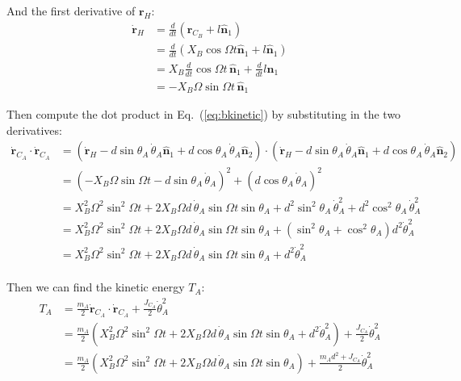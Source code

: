 \documentclass[titlepage]{article}
\begin{document}
And the first derivative of $\boldsymbol{r}_H$:
\begin{equation}
	\begin{split}
		\dot{\boldsymbol{r}}_H&=\frac{d}{dt}\left(\boldsymbol{r}_{C_B}+l\hat{\boldsymbol{n}}_1\right) \\
		&=\frac{d}{dt}\left(X_B\cos\Omega t\hat{\boldsymbol{n}}_1+l\hat{\boldsymbol{n}}_1\right) \\
		&=X_B\frac{d}{dt}\cos\Omega t\,\hat{\boldsymbol{n}}_1+\frac{d}{dt}l\hat{\boldsymbol{n}}_1 \\
		&=-X_B\Omega\sin\Omega t\,\hat{\boldsymbol{n}}_1
	\end{split}
	\label{eq:hingevel}
\end{equation}

Then compute the dot product in Eq.~(\ref{eq:bkinetic}) by substituting in the two derivatives:
\begin{equation}
	\begin{split}
		\dot{\boldsymbol{r}}_{C_A}\cdot\dot{\boldsymbol{r}}_{C_A}&=\left(\dot{\boldsymbol{r}}_H-d\sin\theta_A\,\dot{\theta}_A\hat{\boldsymbol{n}}_1+d\cos\theta_A\,\dot{\theta}_A\hat{\boldsymbol{n}}_2\right)\cdot\left(\dot{\boldsymbol{r}}_H-d\sin\theta_A\,\dot{\theta}_A\hat{\boldsymbol{n}}_1+d\cos\theta_A\,\dot{\theta}_A\hat{\boldsymbol{n}}_2\right) \\
		&=\left(-X_B\Omega\sin\Omega t-d\sin\theta_A\,\dot{\theta}_A\right)^2+\left(d\cos\theta_A\,\dot{\theta}_A\right)^2 \\
		&=X_B^2\Omega^2\sin^2\Omega t+2X_B\Omega d\,\dot{\theta}_A\sin\Omega t\sin\theta_A+d^2\sin^2\theta_A\,\dot{\theta}_A^2+d^2\cos^2\theta_A\,\dot{\theta}_A^2 \\
		&=X_B^2\Omega^2\sin^2\Omega t+2X_B\Omega d\,\dot{\theta}_A\sin\Omega t\sin\theta_A+\left(\sin^2\theta_A+\cos^2\theta_A\right)d^2\dot{\theta}_A^2 \\
		&=X_B^2\Omega^2\sin^2\Omega t+2X_B\Omega d\,\dot{\theta}_A\sin\Omega t\sin\theta_A+d^2\dot{\theta}_A^2 \\
	\end{split}
\end{equation}

Then we can find the kinetic energy $T_A$:
\begin{equation}
	\begin{split}
		T_A&=\frac{m_A}{2}\dot{\boldsymbol{r}}_{C_A}\cdot\dot{\boldsymbol{r}}_{C_A}+\frac{J_{C_A}}{2}\dot{\theta}_A^2 \\
		&=\frac{m_A}{2}\left(X_B^2\Omega^2\sin^2\Omega t+2X_B\Omega d\,\dot{\theta}_A\sin\Omega t\sin\theta_A+d^2\dot{\theta}_A^2\right)+\frac{J_{C_A}}{2}\dot{\theta}_A^2 \\
		&=\frac{m_A}{2}\left(X_B^2\Omega^2\sin^2\Omega t+2X_B\Omega d\,\dot{\theta}_A\sin\Omega t\sin\theta_A\right)+\frac{m_Ad^2+J_{C_A}}{2}\dot{\theta}_A^2 
	\end{split}
\end{equation}
\end{document}
